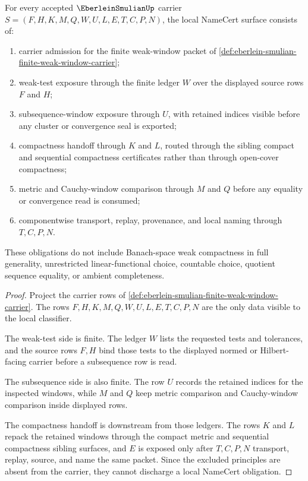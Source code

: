 \begin{theorem}
\label{thm:eberlein-smulian-seed-obligations}
For every accepted $\EberleinSmulianUp$ carrier $S=(F,H,K,M,Q,W,U,L,E,T,C,P,N)$, the local NameCert surface consists of:
\begin{enumerate}
\item carrier admission for the finite weak-window packet of \autoref{def:eberlein-smulian-finite-weak-window-carrier};
\item weak-test exposure through the finite ledger $W$ over the displayed source rows $F$ and $H$;
\item subsequence-window exposure through $U$, with retained indices visible before any cluster or convergence seal is exported;
\item compactness handoff through $K$ and $L$, routed through the sibling compact and sequential compactness certificates rather than through open-cover compactness;
\item metric and Cauchy-window comparison through $M$ and $Q$ before any equality or convergence read is consumed;
\item componentwise transport, replay, provenance, and local naming through $T,C,P,N$.
\end{enumerate}
These obligations do not include Banach-space weak compactness in full generality, unrestricted linear-functional choice, countable choice, quotient sequence equality, or ambient completeness.
\end{theorem}
\begin{proof}
Project the carrier rows of \autoref{def:eberlein-smulian-finite-weak-window-carrier}. The rows $F,H,K,M,Q,W,U,L,E,T,C,P,N$ are the only data visible to the local classifier.

The weak-test side is finite. The ledger $W$ lists the requested tests and tolerances, and the source rows $F,H$ bind those tests to the displayed normed or Hilbert-facing carrier before a subsequence row is read.

The subsequence side is also finite. The row $U$ records the retained indices for the inspected windows, while $M$ and $Q$ keep metric comparison and Cauchy-window comparison inside displayed rows.

The compactness handoff is downstream from those ledgers. The rows $K$ and $L$ repack the retained windows through the compact metric and sequential compactness sibling surfaces, and $E$ is exposed only after $T,C,P,N$ transport, replay, source, and name the same packet. Since the excluded principles are absent from the carrier, they cannot discharge a local NameCert obligation.
\end{proof}

